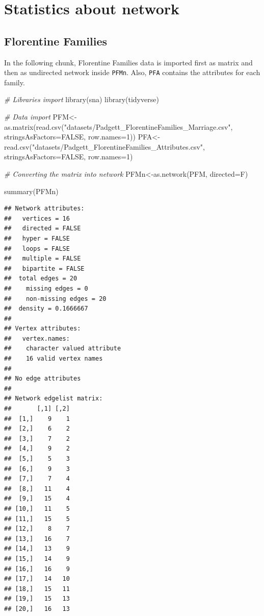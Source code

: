 \documentclass[
  notitlepage,
  onecolumn,
  openany]{book}
\newenvironment{Shaded}{\begin{snugshade}}{\end{snugshade}}
\newcommand{\AttributeTok}[1]{\textcolor[rgb]{0.77,0.63,0.00}{#1}}
\newcommand{\CommentTok}[1]{\textcolor[rgb]{0.56,0.35,0.01}{\textit{#1}}}
\newcommand{\ConstantTok}[1]{\textcolor[rgb]{0.00,0.00,0.00}{#1}}
\newcommand{\DecValTok}[1]{\textcolor[rgb]{0.00,0.00,0.81}{#1}}
\newcommand{\FunctionTok}[1]{\textcolor[rgb]{0.00,0.00,0.00}{#1}}
\newcommand{\NormalTok}[1]{#1}
\newcommand{\OtherTok}[1]{\textcolor[rgb]{0.56,0.35,0.01}{#1}}
\newcommand{\StringTok}[1]{\textcolor[rgb]{0.31,0.60,0.02}{#1}}
\begin{document}
\hypertarget{statistics-about-network}{%
\chapter{Statistics about network}\label{statistics-about-network}}

\hypertarget{florentine-families-1}{%
\section{Florentine Families}\label{florentine-families-1}}

In the following chunk, Florentine Families data is imported first as matrix and then as undirected network inside \texttt{PFMn}. Also, \texttt{PFA} contains the attributes for each family.

\begin{Shaded}
\begin{Highlighting}[]
\CommentTok{\# Libraries import}
\FunctionTok{library}\NormalTok{(sna)}
\FunctionTok{library}\NormalTok{(tidyverse)}

\CommentTok{\# Data import}
\NormalTok{PFM}\OtherTok{\textless{}{-}}\FunctionTok{as.matrix}\NormalTok{(}\FunctionTok{read.csv}\NormalTok{(}\StringTok{"datasets/Padgett\_FlorentineFamilies\_Marriage.csv"}\NormalTok{,}
                        \AttributeTok{stringsAsFactors=}\ConstantTok{FALSE}\NormalTok{, }\AttributeTok{row.names=}\DecValTok{1}\NormalTok{))}
\NormalTok{PFA}\OtherTok{\textless{}{-}}\FunctionTok{read.csv}\NormalTok{(}\StringTok{"datasets/Padgett\_FlorentineFamilies\_Attributes.csv"}\NormalTok{,}
              \AttributeTok{stringsAsFactors=}\ConstantTok{FALSE}\NormalTok{, }\AttributeTok{row.names=}\DecValTok{1}\NormalTok{)}

\CommentTok{\# Converting the matrix into network}
\NormalTok{PFMn}\OtherTok{\textless{}{-}}\FunctionTok{as.network}\NormalTok{(PFM, }\AttributeTok{directed=}\NormalTok{F)}

\FunctionTok{summary}\NormalTok{(PFMn)}
\end{Highlighting}
\end{Shaded}

\begin{verbatim}
## Network attributes:
##   vertices = 16
##   directed = FALSE
##   hyper = FALSE
##   loops = FALSE
##   multiple = FALSE
##   bipartite = FALSE
##  total edges = 20 
##    missing edges = 0 
##    non-missing edges = 20 
##  density = 0.1666667 
## 
## Vertex attributes:
##   vertex.names:
##    character valued attribute
##    16 valid vertex names
## 
## No edge attributes
## 
## Network edgelist matrix:
##       [,1] [,2]
##  [1,]    9    1
##  [2,]    6    2
##  [3,]    7    2
##  [4,]    9    2
##  [5,]    5    3
##  [6,]    9    3
##  [7,]    7    4
##  [8,]   11    4
##  [9,]   15    4
## [10,]   11    5
## [11,]   15    5
## [12,]    8    7
## [13,]   16    7
## [14,]   13    9
## [15,]   14    9
## [16,]   16    9
## [17,]   14   10
## [18,]   15   11
## [19,]   15   13
## [20,]   16   13
\end{verbatim}
\end{document}
